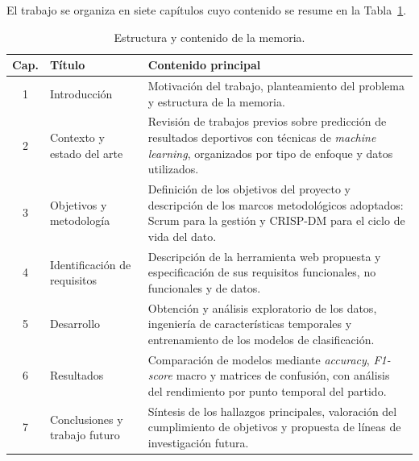 El trabajo se organiza en siete capítulos cuyo contenido se resume en la Tabla~\ref{tab:estructura}.

\begin{table}[H]
    \centering
    \small
    \renewcommand{\arraystretch}{1.3}
    \begin{tabularx}{\textwidth}{|c|p{3.8cm}|X|}
        \hline
        \textbf{Cap.} & \textbf{Título}               & \textbf{Contenido principal}                                                                                                                                          \\
        \hline
        1             & Introducción                  & Motivación del trabajo, planteamiento del problema y estructura de la memoria.                                                                                        \\
        \hline
        2             & Contexto y estado del arte    & Revisión de trabajos previos sobre predicción de resultados deportivos con técnicas de \textit{machine learning}, organizados por tipo de enfoque y datos utilizados. \\
        \hline
        3             & Objetivos y metodología       & Definición de los objetivos del proyecto y descripción de los marcos metodológicos adoptados: Scrum para la gestión y CRISP-DM para el ciclo de vida del dato.        \\
        \hline
        4             & Identificación de requisitos  & Descripción de la herramienta web propuesta y especificación de sus requisitos funcionales, no funcionales y de datos.                                                \\
        \hline
        5             & Desarrollo                    & Obtención y análisis exploratorio de los datos, ingeniería de características temporales y entrenamiento de los modelos de clasificación.                             \\
        \hline
        6             & Resultados                    & Comparación de modelos mediante \textit{accuracy}, \textit{F1-score} macro y matrices de confusión, con análisis del rendimiento por punto temporal del partido.      \\
        \hline
        7             & Conclusiones y trabajo futuro & Síntesis de los hallazgos principales, valoración del cumplimiento de objetivos y propuesta de líneas de investigación futura.                                        \\
        \hline
    \end{tabularx}
    \caption{Estructura y contenido de la memoria.}
    \label{tab:estructura}
\end{table}